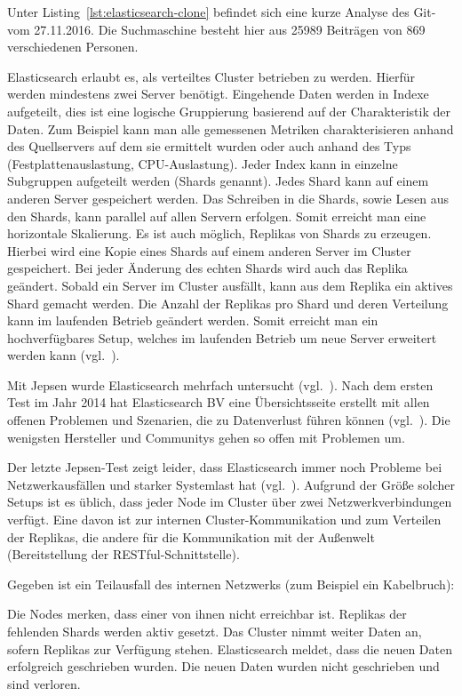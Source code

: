 Unter Listing~\ref{lst:elasticsearch-clone} befindet sich eine kurze Analyse
des \gls{Git}- vom 27.11.2016. Die
Suchmaschine besteht hier aus 25989 Beiträgen von 869 verschiedenen Personen.

Elasticsearch erlaubt es, als verteiltes Cluster betrieben zu werden. Hierfür
werden mindestens zwei Server benötigt. Eingehende Daten werden in Indexe
aufgeteilt, dies ist eine logische Gruppierung basierend auf der Charakteristik
der Daten. Zum Beispiel kann man alle gemessenen Metriken charakterisieren
anhand des Quellservers auf dem sie ermittelt wurden oder auch anhand des Typs
(Festplattenauslastung, CPU\hyp{}Auslastung). Jeder Index kann in einzelne
Subgruppen aufgeteilt werden (Shards genannt). Jedes Shard kann auf einem
anderen Server gespeichert werden. Das Schreiben in die Shards, sowie Lesen aus
den Shards, kann parallel auf allen Servern erfolgen. Somit erreicht man eine
horizontale \gls{Skalierung}. Es ist auch möglich, Replikas von Shards zu
erzeugen. Hierbei wird eine Kopie eines Shards auf einem anderen Server im
Cluster gespeichert. Bei jeder Änderung des echten Shards wird auch das Replika
geändert. Sobald ein Server im Cluster ausfällt, kann aus dem Replika ein
aktives Shard gemacht werden. Die Anzahl der Replikas pro Shard und deren
Verteilung kann im laufenden Betrieb geändert werden. Somit erreicht man ein
hochverfügbares Setup, welches im laufenden Betrieb um neue Server erweitert
werden kann (vgl.~\cite{es_concepts}).

Mit \gls{Jepsen} wurde Elasticsearch mehrfach untersucht
(vgl.~\cite{es_jepsen_all}). Nach dem ersten Test im Jahr 2014 hat
Elasticsearch BV eine Übersichtsseite erstellt mit allen offenen Problemen und
Szenarien, die zu Datenverlust führen können (vgl.~\cite{es_resiliency}). Die
wenigsten Hersteller und Communitys gehen so offen mit Problemen um.

Der letzte \gls{Jepsen}\hyp{}Test zeigt leider, dass Elasticsearch immer noch
Probleme bei Netzwerkausfällen und starker Systemlast hat
(vgl.~\cite{jepsen_elastic}). Aufgrund der Größe solcher Setups ist es üblich,
dass jeder Node im Cluster über zwei Netzwerkverbindungen verfügt. Eine davon
ist zur internen Cluster\hyp{}Kommunikation und zum Verteilen der Replikas, die
andere für die Kommunikation mit der Außenwelt (Bereitstellung der
\gls{RESTful}\hyp{}Schnittstelle).

Gegeben ist ein Teilausfall des internen Netzwerks (zum Beispiel ein
Kabelbruch):

\begin{outline}
  \1 Die Nodes merken, dass einer von ihnen nicht erreichbar ist.
  \1 Replikas der fehlenden Shards werden aktiv gesetzt.
  \1 Das Cluster nimmt weiter Daten an, sofern Replikas zur Verfügung stehen.
  \1 Elasticsearch meldet, dass die neuen Daten erfolgreich geschrieben wurden.
  \1 Die neuen Daten wurden nicht geschrieben und sind verloren.
\end{outline}

